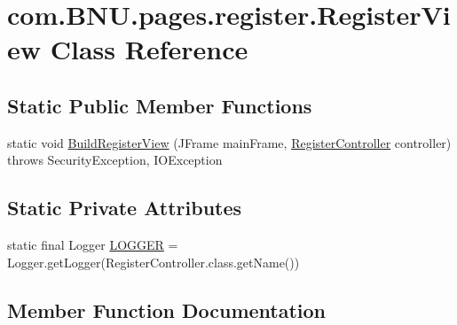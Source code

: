 \hypertarget{classcom_1_1_b_n_u_1_1pages_1_1register_1_1_register_view}{}\section{com.\+B\+N\+U.\+pages.\+register.\+Register\+View Class Reference}
\label{classcom_1_1_b_n_u_1_1pages_1_1register_1_1_register_view}
\subsection*{Static Public Member Functions}
\begin{DoxyCompactItemize}
\item 
static void \mbox{\hyperlink{classcom_1_1_b_n_u_1_1pages_1_1register_1_1_register_view_ad6d67edd6f7ff3c1b5e8d7e3d5cf97f7}{Build\+Register\+View}} (J\+Frame main\+Frame, \mbox{\hyperlink{classcom_1_1_b_n_u_1_1pages_1_1register_1_1_register_controller}{Register\+Controller}} controller)  throws Security\+Exception, I\+O\+Exception 
\end{DoxyCompactItemize}
\subsection*{Static Private Attributes}
\begin{DoxyCompactItemize}
\item 
static final Logger \mbox{\hyperlink{classcom_1_1_b_n_u_1_1pages_1_1register_1_1_register_view_a577e161755f31a1e882e40532bbc19cd}{L\+O\+G\+G\+ER}} = Logger.\+get\+Logger(Register\+Controller.\+class.\+get\+Name())
\end{DoxyCompactItemize}


\subsection{Member Function Documentation}
\mbox{\label{classcom_1_1_b_n_u_1_1pages_1_1register_1_1_register_view_ad6d67edd6f7ff3c1b5e8d7e3d5cf97f7}} 
